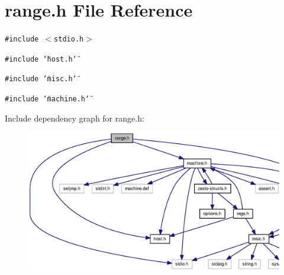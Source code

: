 \section{range.h File Reference}
\label{range_8h}
{\tt \#include $<$stdio.h$>$}\par
{\tt \#include \char`\"{}host.h\char`\"{}}\par
{\tt \#include \char`\"{}misc.h\char`\"{}}\par
{\tt \#include \char`\"{}machine.h\char`\"{}}\par


Include dependency graph for range.h:\nopagebreak
\begin{figure}[H]
\begin{center}
\leavevmode
\includegraphics[width=353pt]{range_8h__incl}
\end{center}
\end{figure}
